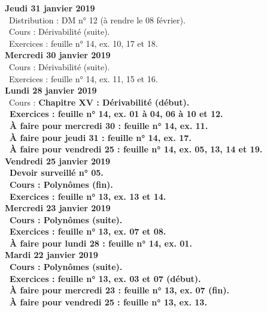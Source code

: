 \documentclass[12pt,a4paper]{article}
\begin{document}
\noindent\textbf{Jeudi 31 janvier 2019}\\
\bu\ Distribution : DM n° 12 (à rendre le 08 février).\\
\bu\ Cours : Dérivabilité (suite).\\
\bu\ Exercices : feuille n° 14, ex. 10, 17 et 18.\vspace{.4cm}\\
 
\noindent\textbf{Mercredi 30 janvier 2019} \\
\bu\ Cours : Dérivabilité (suite).\\
\bu\ Exercices : feuille n° 14, ex. 11, 15 et 16.\vspace{.4cm}\\
 
\noindent\textbf{Lundi 28 janvier 2019} \\
\bu\ Cours : \bf Chapitre XV \rm : Dérivabilité (début).\\
\bu\ Exercices : feuille n° 14, ex. 01 à 04, 06 à 10 et 12.\\
\bu\ À faire pour mercredi 30 : feuille n° 14, ex. 11.\\
\bu\ À faire pour jeudi 31 : feuille n° 14, ex. 17.\\
\bu\ À faire pour vendredi 25 : feuille n° 14, ex. 05, 13, 14 et 19.\vspace{.4cm}\\
 
\noindent\textbf{Vendredi 25 janvier 2019}\\
\bu\ Devoir surveillé n° 05.\\
\bu\ Cours : Polynômes (fin).\\
\bu\ Exercices : feuille n° 13, ex. 13 et 14.\vspace{.4cm}\\

\noindent\textbf{Mercredi 23 janvier 2019} \\
\bu\ Cours : Polynômes (suite).\\
\bu\ Exercices : feuille n° 13, ex. 07 et 08.\\
\bu\ À faire pour lundi 28 : feuille n° 14, ex. 01.\vspace{.4cm}\\
 
\noindent\textbf{Mardi 22 janvier 2019} \\
\bu\ Cours : Polynômes (suite).\\
\bu\ Exercices : feuille n° 13, ex. 03 et 07 (début).\\
\bu\ À faire pour mercredi 23 : feuille n° 13, ex. 07 (fin).\\
\bu\ À faire pour vendredi 25 : feuille n° 13, ex. 13.\vspace{.4cm}\\
\end{document}
